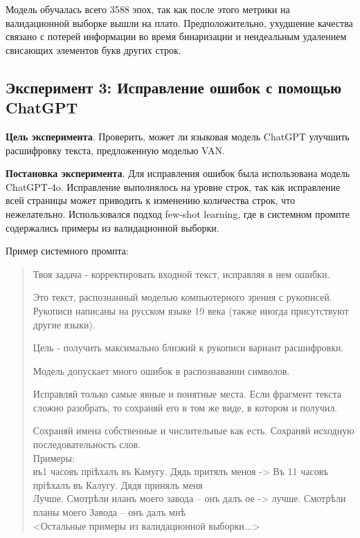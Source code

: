 \documentclass{extarticle}
\begin{document}
Модель обучалась всего 3588 эпох, так как после этого метрики на валидационной выборке вышли на плато. Предположительно, ухудшение качества связано с потерей информации во время бинаризации и неидеальным удалением свисающих элементов букв других строк.

\subsection{Эксперимент 3: Исправление ошибок с помощью ChatGPT}

\textbf{Цель эксперимента}. Проверить, может ли языковая модель ChatGPT улучшить расшифровку текста, предложенную моделью VAN.

\textbf{Постановка эксперимента}. Для исправления ошибок была использована модель ChatGPT-4o. Исправление выполнялось на уровне строк, так как исправление всей страницы может приводить к изменению количества строк, что нежелательно. Использовался подход few-shot learning, где в системном промпте содержались примеры из валидационной выборки.

Пример системного промпта:
\begin{quote}
	Твоя задача - корректировать входной текст, исправляя в нем ошибки.
	
	Это текст, распознанный моделью компьютерного зрения с рукописей. Рукописи написаны на русском языке 19 века (также иногда присутствуют другие языки).
	
	Цель - получить максимально близкий к рукописи вариант расшифровки.
	
	Модель допускает много ошибок в распознавании символов.
	
	Исправляй только самые явные и понятные места. Если фрагмент текста сложно разобрать, то сохраняй его в том же виде, в котором и получил.
	
	Сохраняй имена собственные и числительные как есть. Сохраняй исходную последовательность слов. \\
	
	Примеры: \\
	въ1 часовъ пріѣхалъ въ Камугу. Дядь притялъ меноя -> Въ 11 часовъ пріѣхалъ въ Калугу. Дядя принялъ меня \\
	Лучше. Смотрѣли иланъ моего завода – онъ далъ ое -> лучше. Смотрѣли планы моего Завода – онъ далъ мнѣ \\
	<Остальные примеры из валидационной выборки...> \\
\end{quote}
\end{document}

